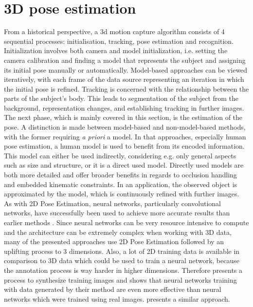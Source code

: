 \section{3D pose estimation}
From a historical perspective, a 3d motion capture algorithm consists of 4 sequential processes: initialisation, tracking, pose estimation and recognition. Initialization involves both camera and model initialization, i.e. setting the camera calibration and finding a model that represents the subject and assigning its initial pose manually or automatically. Model-based approaches can be viewed iteratively, with each frame of the data source representing an iteration in which the initial pose is refined. Tracking is concerned with the relationship between the parts of the subject's body. This leads to segmentation of the subject from the background, representation changes, and establishing tracking in further images. The next phase, which is mainly covered in this section, is the estimation of the pose. A distinction is made between model-based and non-model-based methods, with the former requiring  \emph{a priori} a model. In that approaches, especially human pose estimation, a human model is used to benefit from its encoded information. This model can either be used indirectly, considering e.g. only general aspects such as size and structure, or it is a direct used model. Directly used models are both more detailed and offer broader benefits in regards to occlusion handling and embedded kinematic constraints. In an application, the observed object is approximated by the model, which is continuously refined with further images.\cite{summary80s}
\\
As with 2D Pose Estimation, neural networks, particularly convolutional networks, have successfully been used to achieve more accurate results than earlier methods \cite{WANG2021103225, Chen2016, Chen_2017_CVPR, Tome_2017_CVPR, Andrikula2010, Ye2011, Martinez_2017_ICCV}. Since neural networks can be very resource intensive to compute and the architecture can be extremely complex when working with 3D data, many  of the presented approaches use 2D Pose Estimation followed by an uplifting process to 3 dimensions. Also, a lot of 2D training data is available in comparison to 3D data which could be used to train a neural network, because the annotation process is way harder in higher dimensions. Therefore \cite{Chen2016} presents a process to synthesize training images and shows that neural networks training with data generated by their method are even more effective than neural networks which were trained using real images. \cite{Rogez2016} presents a similar approach.

